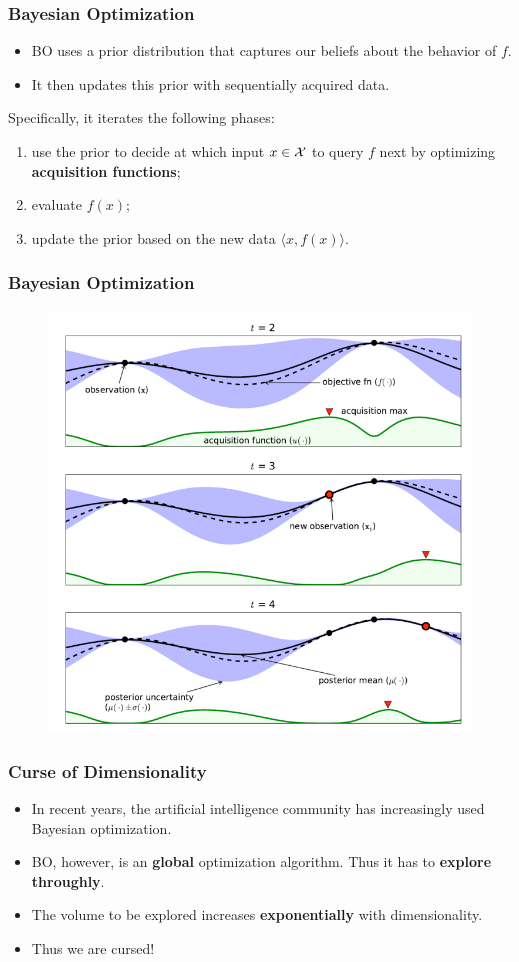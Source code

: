 \documentclass[grey]{beamer}
\begin{document}
\begin{frame}
 \frametitle{Bayesian Optimization}
 \begin{itemize}
  \item BO uses a prior distribution 
  that captures our beliefs about the behavior of $f$.
  \item It then updates this prior with sequentially acquired data.
 \end{itemize}

 Specifically, it iterates the following phases:
 \begin{enumerate}
  \item use the prior to decide at which input $x\in \cal X$ to query $f$ next
  by optimizing {\bf \textcolor{myColor}{acquisition functions}};
  \item evaluate $f(x)$;
  \item update the prior based on the new data $\langle{}x, f(x)\rangle$.
 \end{enumerate}
\end{frame}

 \begin{frame}
 \frametitle{Bayesian Optimization}
  \begin{figure}
   \centering
   \includegraphics[width=0.75\columnwidth]
   {./figs/bo}
   \label{fig:traj}
  \end{figure}
 \end{frame}

 \begin{frame}
 \frametitle{Curse of Dimensionality}
  \begin{itemize}
   \item In recent years, the artificial intelligence community has increasingly used Bayesian optimization.
   \item BO, however, is an {\bf \textcolor{myColor}{global}} 
    optimization algorithm. Thus it has to 
    {\bf \textcolor{myColor}{explore throughly}}.
   \item The volume to be explored increases 
   {\bf \textcolor{myColor}{exponentially}} with dimensionality.
   \item Thus we are cursed!
   
  \end{itemize}
 \end{frame}
\end{document}
